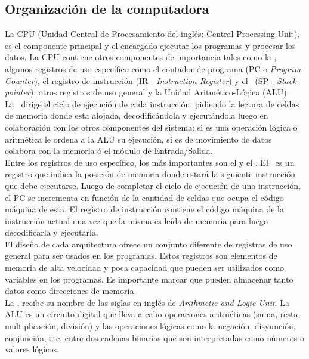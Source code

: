 \subsection{Organización de la computadora}

La CPU (Unidad Central de Procesamiento del inglés: Central Processing Unit), es el componente principal y el encargado ejecutar los programas y procesar los datos. La CPU contiene otros componentes de importancia tales como la \UC, algunos registros de uso específico como el contador de programa (PC o \textit{Program Counter}), el registro de instrucción (IR - \textit{Instruction Register}) y el \SP\ (SP - \textit{Stack pointer}), otros registros de uso general y la Unidad Aritmético-Lógica (ALU).\\

La \UC\ dirige el ciclo de ejecución de cada instrucción, pidiendo la lectura de celdas de memoria donde esta alojada, decodificándola  y ejecutándola luego en colaboración con los otros componentes del sistema: si es una operación lógica o aritmética le ordena a la ALU su ejecución, si es de movimiento de datos colabora con la memoria ó el módulo de Entrada/Salida.\\

Entre los registros de uso específico, los más importantes son el \textbf{\PC} y el \textbf{\IR}. El \PC\ es un registro que indica la posición de memoria donde estará la siguiente instrucción que debe ejecutarse. Luego de completar el ciclo de ejecución de una instrucción, el PC se incrementa en función de la cantidad de celdas que ocupa el código máquina de esta. El registro de instrucción contiene el código máquina de la instrucción actual una vez que la misma es leída de memoria para luego decodificarla y ejecutarla.\\

El diseño de cada arquitectura ofrece un conjunto diferente de registros de uso general para ser usados en los programas. Estos registros son elementos de memoria de alta velocidad y poca capacidad que pueden ser utilizados como variables en los programas. Es importante marcar que pueden almacenar tanto datos como direcciones de memoria.\\

La \ALU, recibe su nombre de las siglas en inglés de \textit{Arithmetic and Logic Unit}. La ALU es un circuito digital que lleva a cabo operaciones aritméticas (suma, resta, multiplicación, división) y las operaciones lógicas como la negación, disyunción, conjunción, etc, entre dos cadenas binarias que son interpretadas como números o valores lógicos.\\


